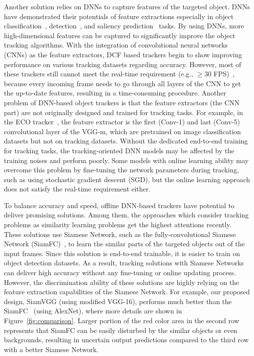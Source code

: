 \documentclass[runningheads]{llncs}
\begin{document}
Another solution relies on DNNs to capture features of the targeted object. DNNs have demonstrated their potentials of feature extractions especially in object classification~\cite{krizhevsky2012imagenet}, detection~\cite{redmon2017yolo9000}, and saliency prediction~\cite{li2018csrnet} tasks. By using DNNs, more high-dimensional features can be captured to significantly improve the object tracking algorithms. With the integration of convolutional neural networks (CNNs) as the feature extractors, DCF based trackers begin to show improving performance on various tracking datasets regarding accuracy. However, most of these trackers still cannot meet the real-time requirement (e.g., $\geq$30 FPS)~\cite{danelljan2017eco}, because every incoming frame needs to go through all layers of the CNN to get the up-to-date features, resulting in a time-consuming procedure. Another problem of DNN-based object trackers is that the feature extractors (the CNN part) are not originally designed and trained for tracking tasks. For example, in the ECO tracker~\cite{danelljan2017eco}, the feature extractor is the first (Conv-1) and last (Conv-5) convolutional layer of the VGG-m, which are pretrained on image classification datasets but not on tracking datasets. Without the dedicated end-to-end training for tracking tasks, the tracking-oriented DNN models may be affected by the training noises and perform poorly. Some models with online learning ability may overcome this problem by fine-tuning the network parameters during tracking, such as using stochastic gradient descent (SGD), but the online learning approach does not satisfy the real-time requirement either.

To balance accuracy and speed, offline DNN-based trackers have potential to deliver promising solutions. Among them, the approaches which consider tracking problems as similarity learning problems get the highest attentions recently. These solutions use Siamese Network, such as the fully-convolutional Siamese Network (SiamFC)~\cite{bertinetto2016fully}, to learn the similar parts of the targeted objects out of the input frames. Since this solution is end-to-end trainable, it is easier to train on object detection datasets.
As a result, tracking solutions with Siamese Networks can deliver high accuracy without any fine-tuning or online updating process. However, the discrimination ability of these solutions are highly relying on the feature extraction capabilities of the Siamese Network. For example, our proposed design, SiamVGG (using modified VGG-16), performs much better than the SiamFC~\cite{bertinetto2016fully} (using AlexNet), where more details are shown in Figure~\ref{fig:comparison}. 
Larger portion of the red color area in the second row represents that SiamFC can be easily disturbed by the similar objects or even backgrounds, resulting in uncertain output predictions compared to the third row with a better Siamese Network.
\end{document}
